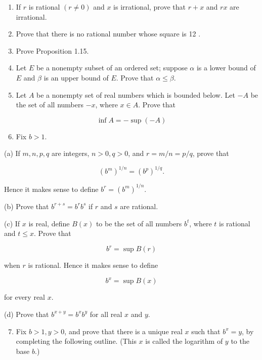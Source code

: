 \documentclass[10pt]{article}
\begin{document}
\begin{enumerate}
  \item If $r$ is rational $(r \neq 0)$ and $x$ is irrational, prove that $r+x$ and $r x$ are irrational.

  \item Prove that there is no rational number whose square is 12 .

  \item Prove Proposition 1.15.

  \item Let $E$ be a nonempty subset of an ordered set; suppose $\alpha$ is a lower bound of $E$ and $\beta$ is an upper bound of $E$. Prove that $\alpha \leq \beta$.

  \item Let $A$ be a nonempty set of real numbers which is bounded below. Let $-A$ be the set of all numbers $-x$, where $x \in A$. Prove that

\end{enumerate}

$$
\inf A=-\sup (-A)
$$

\begin{enumerate}
  \setcounter{enumi}{5}
  \item Fix $b>1$.
\end{enumerate}

(a) If $m, n, p, q$ are integers, $n>0, q>0$, and $r=m / n=p / q$, prove that

$$
\left(b^{m}\right)^{1 / n}=\left(b^{p}\right)^{1 / q} .
$$

Hence it makes sense to define $b^{r}=\left(b^{m}\right)^{1 / n}$.

(b) Prove that $b^{r+s}=b^{r} b^{s}$ if $r$ and $s$ are rational.

(c) If $x$ is real, define $B(x)$ to be the set of all numbers $b^{t}$, where $t$ is rational and $t \leq x$. Prove that

$$
b^{r}=\sup B(r)
$$

when $r$ is rational. Hence it makes sense to define

$$
b^{x}=\sup B(x)
$$

for every real $x$.

(d) Prove that $b^{x+y}=b^{x} b^{y}$ for all real $x$ and $y$.

\begin{enumerate}
  \setcounter{enumi}{6}
  \item Fix $b>1, y>0$, and prove that there is a unique real $x$ such that $b^{x}=y$, by completing the following outline. (This $x$ is called the logarithm of $y$ to the base $b$.)
\end{enumerate}
\end{document}
